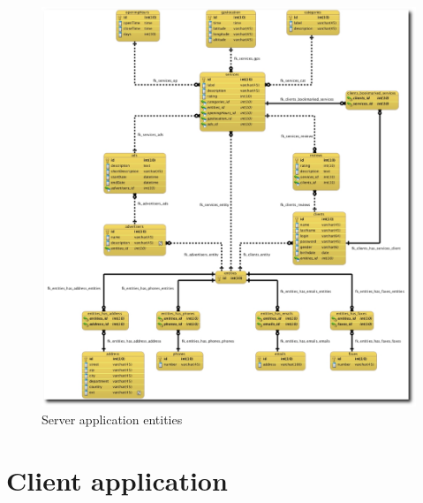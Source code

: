   \begin{figure}[p]
    \begin{center}
      \includegraphics[scale=0.4]{Figures/HyperPathServerEntities.eps}
     \end{center}
     \caption{Server application entities}
     \label{Server application entities}
  \end{figure}
\pagebreak

\section{Client application}